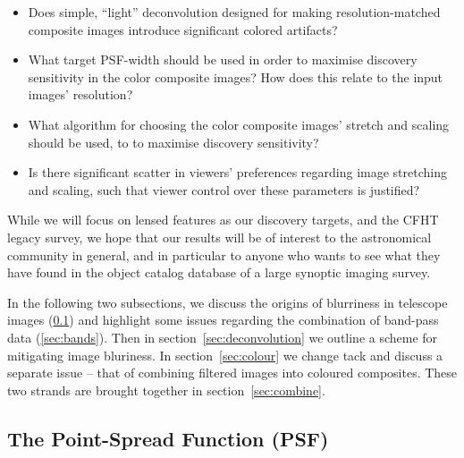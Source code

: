 \documentclass[letterpaper, 11pt]{article}
\begin{document}
\begin{itemize}

	\item Does simple, ``light'' deconvolution designed for making
resolution-matched composite images introduce significant colored artifacts?

	\item What target PSF-width should be used in order to
maximise discovery sensitivity in the color composite images? How does this
relate to the input images' resolution?

	\item What algorithm for choosing the color composite images' stretch and
scaling should be used, to to maximise discovery sensitivity? 

	\item Is there significant scatter in viewers' preferences regarding image
stretching and scaling, such that viewer control over these parameters is
justified?

\end{itemize}

While we will focus on lensed features as our discovery targets, and the CFHT legacy
survey, we hope that our results will be of interest to the astronomical
community in general, and in particular to anyone who wants to see what they
have found in the object catalog database of a large synoptic imaging survey.

In the following two subsections, we discuss the origins of blurriness in telescope images (\ref{sec:psf}) and highlight some issues regarding the combination of band-pass data (\ref{sec:bands}). Then in section~\ref{sec:deconvolution} we outline a scheme for mitigating image bluriness. In section~\ref{sec:colour} we change tack and discuss a separate issue -- that of combining filtered images into coloured composites. These two strands are brought together in section~\ref{sec:combine}.


\subsection{The Point-Spread Function (PSF)}
\label{sec:psf}
\end{document}
